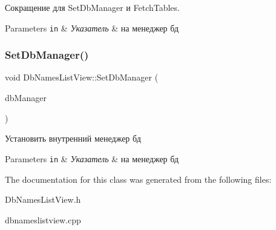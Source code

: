 Сокращение для Set\+Db\+Manager и Fetch\+Tables. 


\begin{DoxyParams}[1]{Parameters}
\mbox{\tt in}  & {\em Указатель} & на менеджер бд \\
\hline
\end{DoxyParams}
\mbox{\label{class_db_names_list_view_a323e31a217223ca8819030b455e88539}} 
\subsubsection{\texorpdfstring{Set\+Db\+Manager()}{SetDbManager()}}
{\footnotesize\ttfamily void Db\+Names\+List\+View\+::\+Set\+Db\+Manager (\begin{DoxyParamCaption}\item[{\hyperlink{class_db_manager}{Db\+Manager} $\ast$}]{db\+Manager }\end{DoxyParamCaption})}



Установить внутренний менеджер бд 


\begin{DoxyParams}[1]{Parameters}
\mbox{\tt in}  & {\em Указатель} & на менеджер бд \\
\hline
\end{DoxyParams}


The documentation for this class was generated from the following files\+:\begin{DoxyCompactItemize}
\item 
Db\+Names\+List\+View.\+h\item 
dbnameslistview.\+cpp\end{DoxyCompactItemize}
